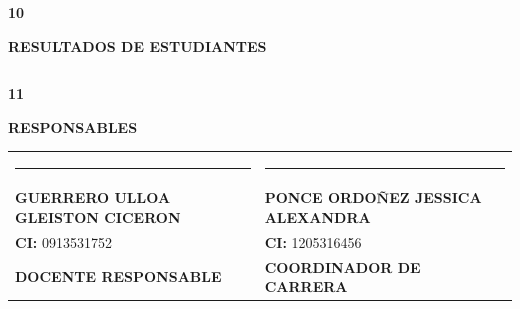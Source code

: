 \documentclass[11pt,a4paper]{article}
\newcommand{\secband}[2]{%
  \par\vspace{9pt}\noindent
  {\setlength{\fboxsep}{0pt}%
   \colorbox{secdark}{\parbox[c][20pt][c]{0.05\textwidth}{\centering\textbf{\color{white}\small #1}}}%
   \colorbox{secblue}{\parbox[c][20pt][c]{0.95\textwidth}{\hspace{8pt}\textbf{\color{white}\small #2}}}%
  }\par\vspace{5pt}}
\begin{document}
\secband{10}{RESULTADOS DE ESTUDIANTES}
\vspace{2pt}\noindent\begin{tabular}{|p{\dimexpr\linewidth-2\tabcolsep\relax}|}
\hline
\rule{0pt}{16pt}\\[60pt]\hline
\end{tabular}

\secband{11}{RESPONSABLES}
\vspace{18pt}
\noindent\begin{tabularx}{\linewidth}{@{}>{\centering\arraybackslash}X >{\centering\arraybackslash}X@{}}
\rule{6.5cm}{0.6pt} & \rule{6.5cm}{0.6pt}\\[2pt]
\textbf{GUERRERO ULLOA GLEISTON CICERON} & \textbf{PONCE ORDOÑEZ JESSICA ALEXANDRA}\\
\textbf{CI:} 0913531752 & \textbf{CI:} 1205316456\\
\textbf{DOCENTE RESPONSABLE} & \textbf{COORDINADOR DE CARRERA}\\
\end{tabularx}
\end{document}
